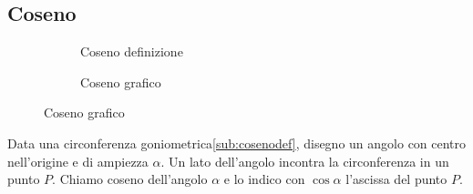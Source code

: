 \subsection{Coseno}
\label{sec:cosenogonio}
\begin{figure}
	\begin{subfigure}[b]{.5\linewidth}
		\centering
		
		\caption{Coseno definizione}\label{sub:cosenodef}
	\end{subfigure}%
	\begin{subfigure}[b]{.5\linewidth}
	\centering
		
		\caption{Coseno grafico}\label{sub:cosenograf}
	\end{subfigure}
	\label{ztzcos}
\end{figure}
\begin{definizione}[Coseno]
Data una circonferenza goniometrica\nobs\vref{sub:cosenodef}, disegno un angolo con centro nell'origine e di ampiezza $\alpha$. Un lato dell'angolo incontra la circonferenza in un punto $P$.  Chiamo coseno dell'angolo $\alpha$ e lo indico con $\cos\alpha$ l'ascissa del punto $P$.
\end{definizione}

